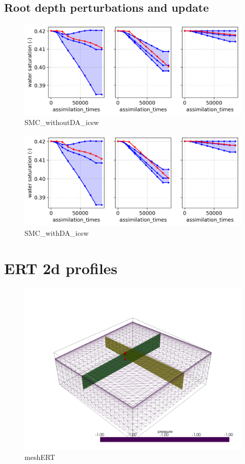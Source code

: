 \documentclass{article}
\begin{document}
\subsection{Root depth perturbations and update}

\begin{figure}[!htbp]
\centering
\includegraphics[width=0.75\linewidth]{files/SMC_withoutDA_ZROOT_-fdc0edfd18f4c02d3995e9d326740a27.png}
\caption[]{SMC\_withoutDA\_icsw}
\label{SMC_withoutDA_icsw}
\end{figure}

\begin{figure}[!htbp]
\centering
\includegraphics[width=0.75\linewidth]{files/SMC_withDA_ZROOT_WIT-b4d213075b05e8e7bc5bdf9a8bd60f8a.png}
\caption[]{SMC\_withDA\_icsw}
\label{SMC_withoutDA_icsw}
\end{figure}

\section{ERT 2d profiles}

\begin{figure}[!htbp]
\centering
\includegraphics[width=0.75\linewidth]{files/meshERT-b7cdcd3033622116ec8ebebe7403f064.png}
\caption[]{meshERT}
\label{meshERT}
\end{figure}
\end{document}

